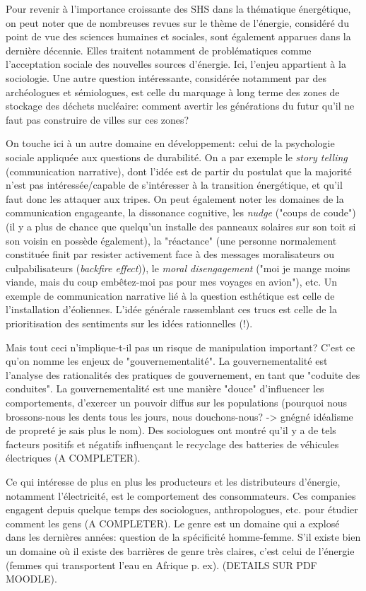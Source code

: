 \documentclass{article}
\begin{document}
 Pour revenir à l'importance croissante des SHS dans la thématique énergétique, on peut noter que de nombreuses revues sur le thème de l'énergie, considéré du point de vue des sciences humaines et sociales, sont également apparues dans la dernière décennie. Elles traitent notamment de problématiques comme l'acceptation sociale des nouvelles sources d'énergie. Ici, l'enjeu appartient à la sociologie. Une autre question intéressante, considérée notamment par des archéologues et sémiologues, est celle du marquage à long terme des zones de stockage des déchets nucléaire: comment avertir les générations du futur qu'il ne faut pas construire de villes sur ces zones? \par
 On touche ici à un autre domaine en développement: celui de la psychologie sociale appliquée aux questions de durabilité. On a par exemple le \emph{story telling} (communication narrative), dont l'idée est de partir du postulat que la majorité n'est pas intéressée/capable de s'intéresser à la transition énergétique, et qu'il faut donc les attaquer aux tripes. On peut également noter les domaines de la communication engageante, la dissonance cognitive, les \emph{nudge} ("coups de coude") (il y a plus de chance que quelqu'un installe des panneaux solaires sur son toit si son voisin en possède également), la "réactance" (une personne normalement constituée finit par resister activement face à des messages moralisateurs ou culpabilisateurs (\emph{backfire effect})), le \emph{moral disengagement} ("moi je mange moins viande, mais du coup embêtez-moi pas pour mes voyages en avion"), etc. Un exemple de communication narrative lié à la question esthétique est celle de l'installation d'éoliennes. L'idée générale rassemblant ces trucs est celle de la prioritisation des sentiments sur les idées rationnelles (!). \par
 Mais tout ceci n'implique-t-il pas un risque de manipulation important? C'est ce qu'on nomme les enjeux de "gouvernementalité". La gouvernementalité est l'analyse des rationalités des pratiques de gouvernement, en tant que "coduite des conduites". La gouvernementalité est une manière "douce" d'influencer les comportements, d'exercer un pouvoir diffus sur les populations (pourquoi nous brossons-nous les dents tous les jours, nous douchons-nous? -> gnégné idéalisme de propreté je sais plus le nom). Des sociologues ont montré qu'il y a de tels facteurs positifs et négatifs influençant le recyclage des batteries de véhicules électriques (A COMPLETER). \par
 Ce qui intéresse de plus en plus les producteurs et les distributeurs d'énergie, notamment l'électricité, est le comportement des consommateurs. Ces companies engagent depuis quelque temps des sociologues, anthropologues, etc. pour étudier comment les gens (A COMPLETER). Le genre est un domaine qui a explosé dans les dernières années: question de la spécificité homme-femme. S'il existe bien un domaine où il existe des barrières de genre très claires, c'est celui de l'énergie (femmes qui transportent l'eau en Afrique p. ex). (DETAILS SUR PDF MOODLE).\par
\end{document}
